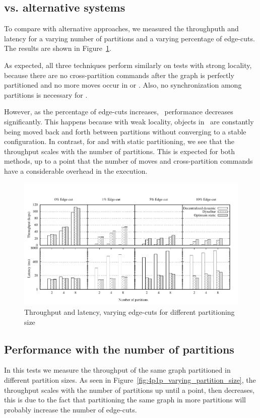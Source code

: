 \subsection{\dynastar vs. alternative systems}
\label{sec:evaluation:results}

To compare \dynastar with alternative approaches, we measured the
throughputh and latency for a varying number of partitions and a
varying percentage of edge-cuts. The results are shown in
Figure~\ref{fig:varying_edge_cut}.

As expected, all three techniques perform similarly on tests with
strong locality, because there are no cross-partition commands after
the graph is perfectly partitioned and no more moves occur in
\dynastar or \dssmr.  Also, no synchronization among partitions is
necessary for \ssmr.

However, as the percentage of edge-cuts increases, \dssmr\ performance
decreases significantly.  This happens because with weak locality,
objects in \dssmr\ are constantly being moved back and forth between
partitions without converging to a stable configuration. In contrast, for \dynastar and \ssmr with
static partitioning, we see that the throughput scales with the
number of partitions. This is expected for both methods, up to a point
that the number of moves and cross-partition commands have a
considerable overhead in the execution. 

\begin{figure}[ht!]
	\includegraphics{figures/experiments/throughput-latency-avg-all}
	\caption{Throughput and latency, varying edge-cuts for different partitioning size}
	\label{fig:varying_edge_cut}
\end{figure}


\subsection{Performance with the number of partitions}
\label{sec:evaluation:results}
In this tests we measure the throughput of the same graph partitioned in different
partition sizes. As seen in Figure~\ref{fig:4p1p_varying_partition_size}, the throughput
scales with the number of partitions up until a point, then decreases, this is due to
the fact that partitioning the same graph in more partitions will probably increase the number of
edge-cuts.


